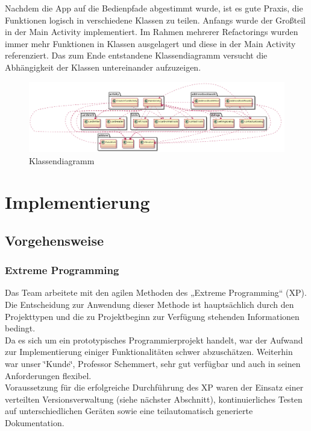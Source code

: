 \documentclass[a4paper,ngerman,12pt]{scrreprt}
\newcommand{\+}{\discretionary{\mbox{\scriptsize$\hookleftarrow$}}{}{}}
\begin{document}
Nachdem die App auf die Bedienpfade abgestimmt wurde, ist es gute Praxis, die Funktionen logisch in verschiedene Klassen zu teilen. Anfangs wurde der Großteil in der Main Activity implementiert. Im Rahmen mehrerer Refactorings wurden immer mehr Funktionen in Klassen ausgelagert und diese in der Main Activity referenziert. Das zum Ende entstandene Klassendiagramm versucht die Abhängigkeit der Klassen untereinander aufzuzeigen.

 
\begin{figure}
\includegraphics[width=\textwidth]{general_class.png}
\caption{Klassendiagramm}
\end{figure}

\chapter{Implementierung}
\section{Vorgehensweise}
\subsection{Extreme Programming}

Das Team arbeitete mit den agilen Methoden des „\+Extreme Programming“ (XP). Die Entscheidung zur Anwendung dieser Methode ist hauptsächlich durch den Projekttypen und die zu Projektbeginn zur Verfügung stehenden Informationen bedingt. \\
Da es sich um ein prototypisches Programmierprojekt handelt, war der Aufwand zur Implementierung einiger Funktionalitäten schwer abzuschätzen. Weiterhin war unser \char`\"{}\+Kunde\char`\"{}, Professor Schemmert, sehr gut verfügbar und auch in seinen Anforderungen flexibel.\\ Voraussetzung für die erfolgreiche Durchführung des XP waren der Einsatz einer verteilten Versionsverwaltung (siehe nächster Abschnitt), kontinuierliches Testen auf unterschiedlichen Geräten sowie eine teilautomatisch generierte Dokumentation.
\end{document}

